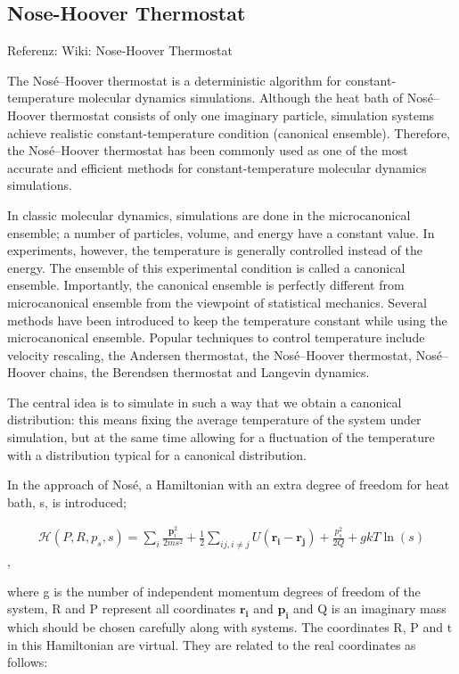 \documentclass[]{article}
\begin{document}
\subsection{Nose-Hoover Thermostat}
Referenz: Wiki: Nose-Hoover Thermostat

The Nosé–Hoover thermostat is a deterministic algorithm for constant-temperature molecular dynamics simulations.
Although the heat bath of Nosé–Hoover thermostat consists of only one imaginary particle, simulation systems achieve realistic constant-temperature condition (canonical ensemble). Therefore, the Nosé–Hoover thermostat has been commonly used as one of the most accurate and efficient methods for constant-temperature molecular dynamics simulations.

In classic molecular dynamics, simulations are done in the microcanonical ensemble; a number of particles, volume, and energy have a constant value. In experiments, however, the temperature is generally controlled instead of the energy. The ensemble of this experimental condition is called a canonical ensemble. Importantly, the canonical ensemble is perfectly different from microcanonical ensemble from the viewpoint of statistical mechanics. Several methods have been introduced to keep the temperature constant while using the microcanonical ensemble. Popular techniques to control temperature include velocity rescaling, the Andersen thermostat, the Nosé–Hoover thermostat, Nosé–Hoover chains, the Berendsen thermostat and Langevin dynamics.

The central idea is to simulate in such a way that we obtain a canonical distribution: this means fixing the average temperature of the system under simulation, but at the same time allowing for a fluctuation of the temperature with a distribution typical for a canonical distribution.

In the approach of Nosé, a Hamiltonian with an extra degree of freedom for heat bath, s, is introduced;

\begin{align*}
\mathcal{H} (P,R,p_s,s) = \sum_i\frac{\mathbf{p}_i^2}{2ms^2} + \frac12 \sum_{ij,i\not= j} U \left( \mathbf{r_i} - \mathbf{r_j}\right) + \frac{p_s^2}{2Q} + gkT\ln\left( s\right)
\end{align*}  ,

where g is the number of independent momentum degrees of freedom of the system, R and P represent all coordinates $\mathbf{r_i}$ and $\mathbf{p_i}$ and Q is an imaginary mass which should be chosen carefully along with systems. The coordinates R, P and t in this Hamiltonian are virtual. They are related to the real coordinates as follows:
\end{document}
